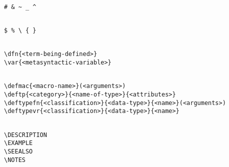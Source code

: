 {\newpage\clearpage
{}%
\begin{display}\begin{verbatim}

# & ~ _ ^\end{verbatim}
\end{display}%
\lthtmlfigureZ
\lthtmlcheckvsize\clearpage}

{\newpage\clearpage
{}%
\begin{display}\begin{verbatim}

$ % \ { }
\end{verbatim}
\end{display}%
\lthtmlfigureZ
\lthtmlcheckvsize\clearpage}

{\newpage\clearpage
{}%
\begin{display}\begin{verbatim}

\dfn{<term-being-defined>}
\var{<metasyntactic-variable>}\end{verbatim}
\end{display}%
\lthtmlfigureZ
\lthtmlcheckvsize\clearpage}

{\newpage\clearpage
{}%
\begin{display}\begin{verbatim}

\defmac{<macro-name>}(<arguments>)
\deftp{<category>}{<name-of-type>}{<attributes>}
\deftypefn{<classification>}{<data-type>}{<name>}(<arguments>)
\deftypevr{<classification>}{<data-type>}{<name>}\end{verbatim}
\end{display}%
\lthtmlfigureZ
\lthtmlcheckvsize\clearpage}

{\newpage\clearpage
{}%
\begin{display}\begin{verbatim}

\DESCRIPTION
\EXAMPLE
\SEEALSO
\NOTES\end{verbatim}
\end{display}%
\lthtmlfigureZ
\lthtmlcheckvsize\clearpage}

